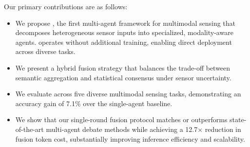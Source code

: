 Our primary contributions are as follows:
\begin{itemize}[nosep, leftmargin=*]
\item We propose \system{}, the first multi-agent framework for multimodal sensing that decomposes heterogeneous sensor inputs into specialized, modality-aware agents. \system{} operates without additional training, enabling direct deployment across diverse tasks.
\item We present a hybrid fusion strategy that balances the trade-off between semantic aggregation and statistical consensus under sensor uncertainty.
\item We evaluate \system{} across five diverse multimodal sensing tasks, demonstrating an accuracy gain of 7.1\% over the single-agent baseline.
\item We show that our single-round fusion protocol matches or outperforms state-of-the-art multi-agent debate methods while achieving a 12.7$\times$ reduction in fusion token cost, substantially improving inference efficiency and scalability.
\end{itemize}